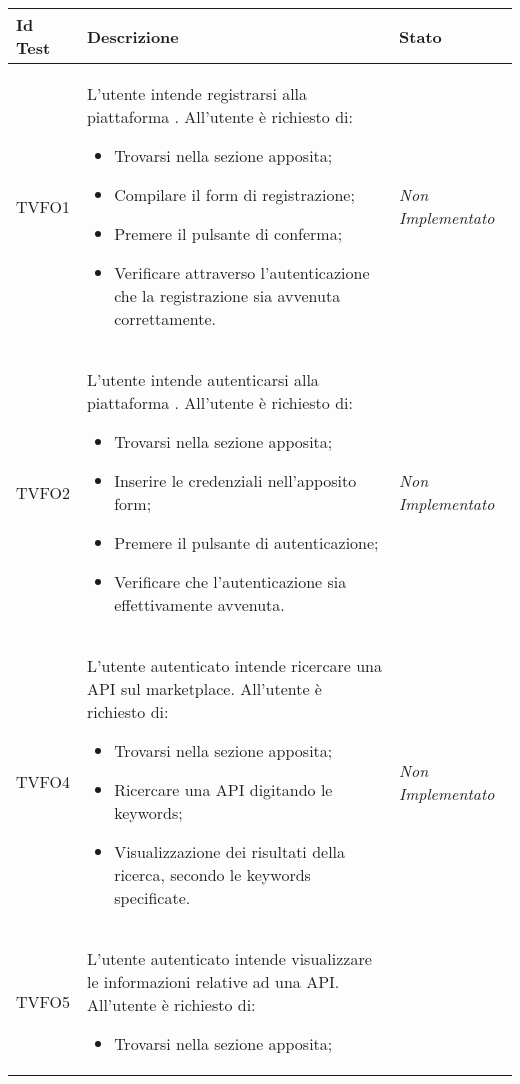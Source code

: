 	\normalsize
	\begin{longtable}{|>{\centering\arraybackslash}p{2cm}|>{\centering\arraybackslash}p{7.5cm} | >{\centering\arraybackslash}p{4cm}|}
		\hline \rowcolor{Gray}
		\textbf{Id Test} & \textbf{Descrizione} & \textbf{Stato}\\
		\hline
		\endhead
		\hypertarget{TVFO1}{TVFO1} & L’utente intende registrarsi alla piattaforma \progetto. All’utente è richiesto di:
		\begin{itemize}
			\item Trovarsi nella sezione apposita;
			\item Compilare il form di registrazione;
			\item Premere il pulsante di conferma;
			\item Verificare attraverso l’autenticazione che la registrazione sia avvenuta correttamente.
		\end{itemize}
		& \textit{Non Implementato}\\ \hline
		\hypertarget{TVFO2}{TVFO2} & L’utente intende autenticarsi alla piattaforma \progetto. All’utente è richiesto di:
		\begin{itemize}
			\item Trovarsi nella sezione apposita;
			\item Inserire le credenziali nell’apposito form;
			\item Premere il pulsante di autenticazione;
			\item Verificare che l’autenticazione sia effettivamente avvenuta.
		\end{itemize}
		& \textit{Non Implementato}\\ \hline
		\hypertarget{TVFO4}{TVFO4} & L’utente autenticato  intende ricercare una API sul marketplace. All’utente è richiesto di:
		\begin{itemize}
			\item Trovarsi nella sezione apposita;
			\item Ricercare una API digitando le keywords;
			\item Visualizzazione dei risultati della ricerca, secondo le keywords specificate.
		\end{itemize} & \textit{Non Implementato}\\ \hline
		\hypertarget{TVFO5}{TVFO5} & L’utente autenticato  intende visualizzare le informazioni relative ad una API. All’utente è richiesto di:
		\begin{itemize}
			\item Trovarsi nella sezione apposita;

\end{itemize}
\end{longtable}
